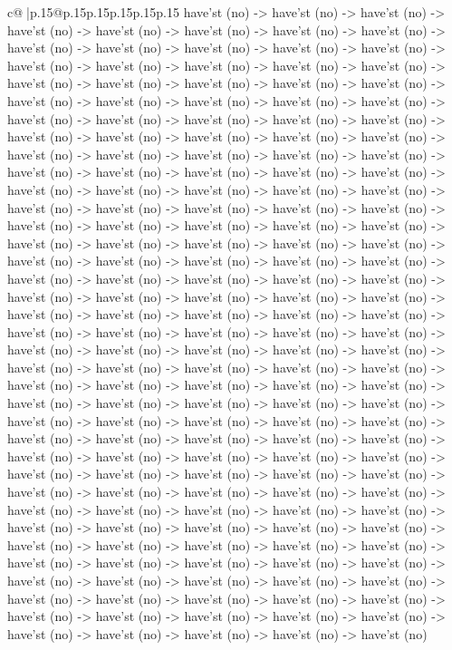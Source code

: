 \documentclass{article}
\begin{document}
{\begin{supertabular}{c@{$\;$}|p{.15\linewidth}@{}p{.15\linewidth}p{.15\linewidth}p{.15\linewidth}p{.15\linewidth}p{.15\linewidth}}
{{{have'st (no) {-}> have'st (no) {-}> have'st (no) {-}> have'st (no) {-}> have'st (no) {-}> have'st (no) {-}> have'st (no) {-}> have'st (no) {-}> have'st (no) {-}> have'st (no) {-}> have'st (no) {-}> have'st (no) {-}> have'st (no) {-}> have'st (no) {-}> have'st (no) {-}> have'st (no) {-}> have'st (no) {-}> have'st (no) {-}> have'st (no) {-}> have'st (no) {-}> have'st (no) {-}> have'st (no) {-}> have'st (no) {-}> have'st (no) {-}> have'st (no) {-}> have'st (no) {-}> have'st (no) {-}> have'st (no) {-}> have'st (no) {-}> have'st (no) {-}> have'st (no) {-}> have'st (no) {-}> have'st (no) {-}> have'st (no) {-}> have'st (no) {-}> have'st (no) {-}> have'st (no) {-}> have'st (no) {-}> have'st (no) {-}> have'st (no) {-}> have'st (no) {-}> have'st (no) {-}> have'st (no) {-}> have'st (no) {-}> have'st (no) {-}> have'st (no) {-}> have'st (no) {-}> have'st (no) {-}> have'st (no) {-}> have'st (no) {-}> have'st (no) {-}> have'st (no) {-}> have'st (no) {-}> have'st (no) {-}> have'st (no) {-}> have'st (no) {-}> have'st (no) {-}> have'st (no) {-}> have'st (no) {-}> have'st (no) {-}> have'st (no) {-}> have'st (no) {-}> have'st (no) {-}> have'st (no) {-}> have'st (no) {-}> have'st (no) {-}> have'st (no) {-}> have'st (no) {-}> have'st (no) {-}> have'st (no) {-}> have'st (no) {-}> have'st (no) {-}> have'st (no) {-}> have'st (no) {-}> have'st (no) {-}> have'st (no) {-}> have'st (no) {-}> have'st (no) {-}> have'st (no) {-}> have'st (no) {-}> have'st (no) {-}> have'st (no) {-}> have'st (no) {-}> have'st (no) {-}> have'st (no) {-}> have'st (no) {-}> have'st (no) {-}> have'st (no) {-}> have'st (no) {-}> have'st (no) {-}> have'st (no) {-}> have'st (no) {-}> have'st (no) {-}> have'st (no) {-}> have'st (no) {-}> have'st (no) {-}> have'st (no) {-}> have'st (no) {-}> have'st (no) {-}> have'st (no) {-}> have'st (no) {-}> have'st (no) {-}> have'st (no) {-}> have'st (no) {-}> have'st (no) {-}> have'st (no) {-}> have'st (no) {-}> have'st (no) {-}> have'st (no) {-}> have'st (no) {-}> have'st (no) {-}> have'st (no) {-}> have'st (no) {-}> have'st (no) {-}> have'st (no) {-}> have'st (no) {-}> have'st (no) {-}> have'st (no) {-}> have'st (no) {-}> have'st (no) {-}> have'st (no) {-}> have'st (no) {-}> have'st (no) {-}> have'st (no) {-}> have'st (no) {-}> have'st (no) {-}> have'st (no) {-}> have'st (no) {-}> have'st (no) {-}> have'st (no) {-}> have'st (no) {-}> have'st (no) {-}> have'st (no) {-}> have'st (no) {-}> have'st (no) {-}> have'st (no) {-}> have'st (no) {-}> have'st (no) {-}> have'st (no) {-}> have'st (no) {-}> have'st (no) {-}> have'st (no) {-}> have'st (no) {-}> have'st (no) {-}> have'st (no) {-}> have'st (no) {-}> have'st (no) {-}> have'st (no) {-}> have'st (no) {-}> have'st (no) {-}> have'st (no) {-}> have'st (no) {-}> have'st (no) {-}> have'st (no) {-}> have'st (no) {-}> have'st (no) {-}> have'st (no) {-}> have'st (no) {-}> have'st (no) {-}> have'st (no) {-}> have'st (no) {-}> have'st (no) {-}> have'st (no) {-}> have'st (no) {-}> have'st (no) {-}> have'st (no) {-}> have'st (no) {-}> have'st (no) {-}> have'st (no) {-}> have'st (no) {-}> have'st (no) {-}> have'st (no) {-}> have'st (no) {-}> have'st (no) {-}> have'st (no) {-}> have'st (no) {-}> have'st (no) {-}> have'st (no) }}}
\end{supertabular}}
\end{document}
